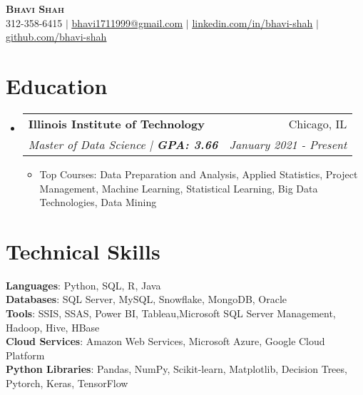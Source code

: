 \documentclass[letterpaper,11pt]{article}
\makeatletter
\newcommand{\resumeItem}[1]{
  \item\small{
    {#1 \vspace{-3pt}}
  }
}
\newcommand{\resumeSubheading}[4]{
  \vspace{-2pt}\item
    \begin{tabular*}{0.97\textwidth}[t]{l@{\extracolsep{\fill}}r}
      \textbf{#1} & #2 \\
      \textit{\small#3} & \textit{\small #4} \\
    \end{tabular*}\vspace{-7pt}
}
\newcommand{\resumeSubHeadingListStart}{\begin{itemize}[leftmargin=0.15in, label={}]}
\newcommand{\resumeSubHeadingListEnd}{\end{itemize}}
\newcommand{\resumeItemListStart}{\begin{itemize}}
\newcommand{\resumeItemListEnd}{\end{itemize}\vspace{-5pt}}
\makeatother
\begin{document}


\begin{center}
    \textbf{\Huge \scshape Bhavi Shah} \\ \vspace{1pt}
    \small 312-358-6415 $|$ \href{mailto:bhavi1711999@gmail.com }{\underline{bhavi1711999@gmail.com}} $|$ 
    \href{https://www.linkedin.com/in/bhavi--shah/}{\underline{linkedin.com/in/bhavi-shah}} $|$
    \href{https://github.com/bhavi1719}{\underline{github.com/bhavi-shah}}
\end{center}


\section{Education}
  \resumeSubHeadingListStart
    \resumeSubheading
      {Illinois Institute of Technology }{Chicago, IL}
      {Master of Data Science |\textbf{ GPA: 3.66}}{January 2021 - Present}
          \resumeItemListStart
            \resumeItem{Top Courses: Data Preparation and Analysis, Applied Statistics, Project Management, Machine Learning, Statistical Learning, Big Data Technologies, Data Mining  }
        \resumeItemListEnd
  \resumeSubHeadingListEnd
  
\section{Technical Skills}
 \begin{itemize}[leftmargin=0.15in, label={}]
    \small{\item{
     \textbf{Languages}{: Python, SQL, R, Java} \\
     \textbf{Databases}{: SQL Server, MySQL, Snowflake, MongoDB, Oracle} \\
     \textbf{Tools}{: SSIS, SSAS, Power BI, Tableau,Microsoft SQL Server Management, Hadoop, Hive, HBase } \\
     \textbf{Cloud Services}{: Amazon Web Services, Microsoft Azure, Google Cloud Platform} \\
      \textbf{Python Libraries}{: Pandas, NumPy, Scikit-learn, Matplotlib, Decision Trees, Pytorch, Keras, TensorFlow} \\
     
    }}
 \end{itemize}


\end{document}
